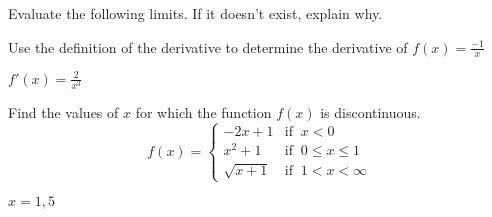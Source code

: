 \documentclass[12pt,letterpaper,addpoints]{exam}
\begin{document}
\newpage
\addpoints
\begin{questions}

\question Evaluate the following limits.  If it doesn't exist, explain why.


\newpage
\addpoints


\question[5] Use the definition of the derivative to determine the derivative of $f(x) = \frac{-1}{x}$
\begin{solution}
$f'(x) = \frac{2}{x^3}$
\end{solution}

\vfill
\question[5] Find the values of $x$ for which the function $f(x)$ is discontinuous. $$\displaystyle f(x)=\begin{cases} -2x+1 & \text{if}\;\; x<0 \\ x^2+1 & \text{if} \;\; 0\leq x \leq 1  \\ \sqrt{x+1} & \text{if} \;\; 1<x< \infty \end{cases}$$

\begin{solution}
$x=1,5$
\end{solution}


\end{questions}
\end{document}
